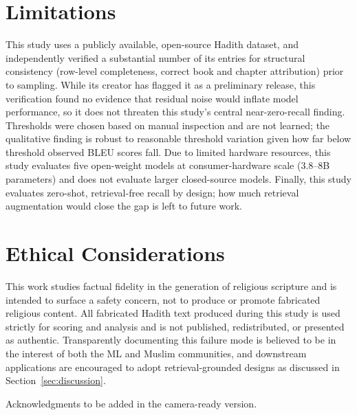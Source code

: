 \documentclass{article}
\begin{document}
\section{Limitations}
\label{sec:limitations}

This study uses a publicly available, open-source Hadith dataset, and
independently verified a substantial number of its entries for structural
consistency (row-level completeness, correct book and chapter attribution)
prior to sampling. While its creator has flagged it as a preliminary
release, this verification found no evidence that residual noise would
inflate model performance, so it does not threaten this study's central
near-zero-recall finding. Thresholds were chosen based on manual inspection
and are not learned; the qualitative finding is robust to reasonable
threshold variation given how far below threshold observed BLEU scores
fall. Due to limited hardware resources, this study evaluates five
open-weight models at consumer-hardware scale (3.8--8B parameters) and does
not evaluate larger closed-source models. Finally, this study evaluates
zero-shot, retrieval-free recall by design; how much retrieval augmentation
would close the gap is left to future work.

\section{Ethical Considerations}
\label{sec:ethics}

This work studies factual fidelity in the generation of religious scripture and
is intended to surface a safety concern, not to produce or promote fabricated
religious content. All fabricated Hadith text produced during this study is
used strictly for scoring and analysis and is not published, redistributed, or
presented as authentic. Transparently documenting this failure mode is
believed to be in the interest of both the ML and Muslim communities, and
downstream applications are encouraged to adopt retrieval-grounded designs
as discussed in Section~\ref{sec:discussion}.

\begin{ack}
Acknowledgments to be added in the camera-ready version.
\end{ack}
\end{document}
